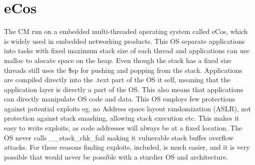 \section{eCos}
\label{sec:eCos}
The CM run on a embedded multi-threaded operating system called eCos, which is widely used in embedded networking products.
This OS separate applications into tasks with fixed maximum stack size of each thread and applications can use malloc to alocate space on the heap.
Even though the stack has a fixed size threads still uses the \$sp for pushing and popping from the stack.
Applications are compiled directly into the .text part of the OS it self, meaning that the application layer is directly a part of the OS.
This also means that applications can directly manipulate OS code and data.
This OS employs few protections against potential exploits eg. no Address space layout randomization (ASLR), not protection against stack smashing, allowing stack execution etc.
This makes it easy to write exploits, as code addresses will always be at a fixed location. The OS never calls \_\_stack\_chk\_fail making it vulnerable stack buffer overflow attacks.
For these reasons finding exploits, \exploitname included, is much easier, and it is very possible that \exploitname would never be possible with a sturdier OS and architecture.